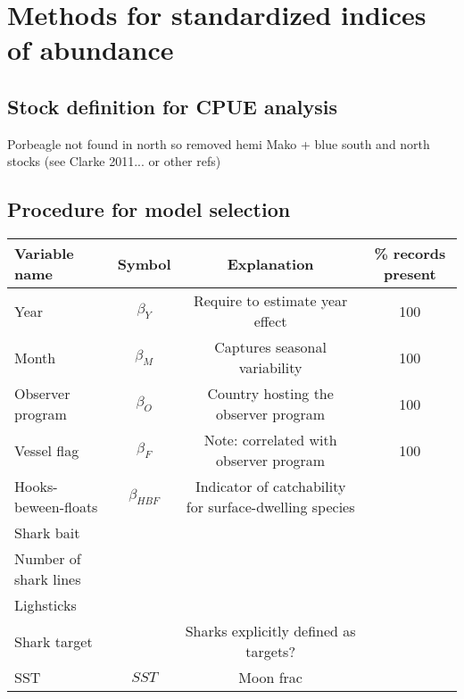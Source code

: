 \documentclass{SCreport}
\begin{document}

\section{Methods for standardized indices of abundance}
\subsection{Stock definition for CPUE analysis}
Porbeagle not found in north so removed hemi
Mako + blue south and north stocks (see Clarke 2011... or other refs)

\subsection{Procedure for model selection}

\begin{table}[!h]
\begin{center}
\begin{tabular}{l|c|c|c}
Variable name & Symbol & Explanation & \% records present\\
\hline
\hline
Year & $\beta_Y$ & Require to estimate year effect & 100\\
Month & $\beta_M$ & Captures seasonal variability & 100\\
Observer program & $\beta_O$ & Country hosting the observer program & 100\\
Vessel flag & $\beta_F$ & Note: correlated with observer program & 100\\
Hooks-beween-floats& $\beta_{HBF}$ & Indicator of catchability for surface-dwelling species\\
Shark bait \\
Number of shark lines\\
Lighsticks \\
Shark target&&Sharks explicitly defined as targets?\\
SST & $SST$ & 
Moon frac && \\

\end{tabular}
\end{center}
\end{table}
\end{document}
